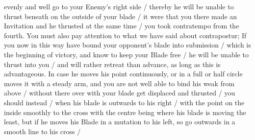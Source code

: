 \newpage


\newpage


evenly and well go to your Enemy's right side / thereby he will be
unable to thrust beneath on the outside of your blade / it were that
you there made an Invitation and he thrusted at the same time / you took
contratempo from the fourth. You must also pay attention to what we
have said about contrapostur; If you now in this way have bound your
opponent's blade into submission / which is the beginning of victory,
and know to keep your Blade free / he will be unable to thrust into you
/ and will rather retreat than advance, as long as this is
advantageous. In case he moves his point continuously, or in a full or
half circle moves it with a steady arm,
and you are not well able to bind his weak from above / without there
over with your blade get displaced and thrusted / you should instead /
when his blade is outwards to his right / with the point on the inside
smoothly to the cross with the centre being where his blade is moving
the least, but if he moves his Blade in a mutation to his left, so go
outwards in a smooth line to his cross / 
